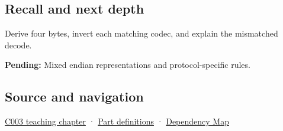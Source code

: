 \subsection{Recall and next depth}\label{appendix-bc07c3d25b18-recall-and-next-depth}

Derive four bytes, invert each matching codec, and explain the mismatched decode.

\textbf{Pending:} Mixed endian representations and protocol-specific rules.

\subsection{Source and navigation}\label{appendix-bc07c3d25b18-source-and-navigation}

\hyperref[01-foundations-i-ch002-where-the-bytes-live]{C003 teaching chapter} · \hyperref[appendix-fd090d982a15-m003---parts-41-60]{Part definitions} · \hyperref[appendix-4ad47bdd269a]{Dependency Map}
